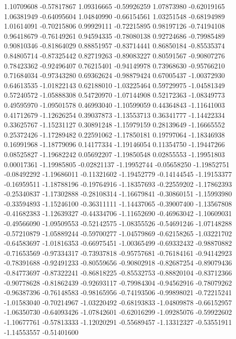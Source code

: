 1.10709608   -0.57817867 
1.09316665   -0.59926259 
1.07873980   -0.62019165 
1.06381949   -0.64095604 
1.04840990   -0.66154561 
1.03251548   -0.68194989 
1.01614091   -0.70215806 
0.99929111   -0.72215895 
0.98197126   -0.74194108 
0.96418679   -0.76149261 
0.94594335   -0.78080138 
0.92724686   -0.79985489 
0.90810346   -0.81864029 
0.88851957   -0.83714441 
0.86850184   -0.85535374 
0.84805714   -0.87325442 
0.82719263   -0.89083227 
0.80591567   -0.90807276 
0.78423362   -0.92496407 
0.76215401   -0.94149978 
0.73968630   -0.95766210 
0.71684034   -0.97343280 
0.69362624   -0.98879424 
0.67005437   -1.00372930 
0.64613535   -1.01822143 
0.62188010   -1.03225464 
0.59729975   -1.04581349 
0.57240572   -1.05888308 
0.54720970   -1.07144908 
0.52172363   -1.08349773 
0.49595970   -1.09501578 
0.46993040   -1.10599059 
0.44364843   -1.11641003 
0.41712679   -1.12626254 
0.39037873   -1.13553713 
0.36341777   -1.14422334 
0.33625767   -1.15231127 
0.30891248   -1.15979159 
0.28139649   -1.16665552 
0.25372426   -1.17289482 
0.22591062   -1.17850181 
0.19797064   -1.18346938 
0.16991968   -1.18779096 
0.14177334   -1.19146054 
0.11354750   -1.19447266 
0.08525827   -1.19682242 
0.05692207   -1.19850548 
0.02855553   -1.19951803 
0.00017361   -1.19985805 
-0.02821137  -1.19952744 
-0.05658250  -1.19852751 
-0.08492292  -1.19686011 
-0.11321602  -1.19452779 
-0.14144545  -1.19153377 
-0.16959511  -1.18788196 
-0.19764916  -1.18357693 
-0.22559202  -1.17862393 
-0.25340837  -1.17302888 
-0.28108314  -1.16679841 
-0.30860151  -1.15993980 
-0.33594893  -1.15246100 
-0.36311111  -1.14437065 
-0.39007400  -1.13567808 
-0.41682383  -1.12639327 
-0.44334706  -1.11652690 
-0.46963042  -1.10609031 
-0.49566090  -1.09509553 
-0.52142575  -1.08355526 
-0.54691246  -1.07148288 
-0.57210879  -1.05889244 
-0.59700277  -1.04579869 
-0.62158265  -1.03221702 
-0.64583697  -1.01816353 
-0.66975451  -1.00365499 
-0.69332432  -0.98870882 
-0.71653569  -0.97334317 
-0.73937818  -0.95757681 
-0.76184161  -0.94142923 
-0.78391688  -0.92491233 
-0.80559656  -0.90802918 
-0.82687254  -0.89079436 
-0.84773697  -0.87322241 
-0.86818225  -0.85532753 
-0.88820104  -0.83712366 
-0.90778628  -0.81862439 
-0.92693117  -0.79984304 
-0.94562916  -0.78079262 
-0.96387396  -0.76148583 
-0.98165956  -0.74193506 
-0.99898021  -0.72215241 
-1.01583040  -0.70214967 
-1.03220492  -0.68193833 
-1.04809878  -0.66152957 
-1.06350730  -0.64093426 
-1.07842601  -0.62016299 
-1.09285076  -0.59922602 
-1.10677761  -0.57813333 
-1.12020291  -0.55689457 
-1.13312327  -0.53551911 
-1.14553557  -0.51401600 
